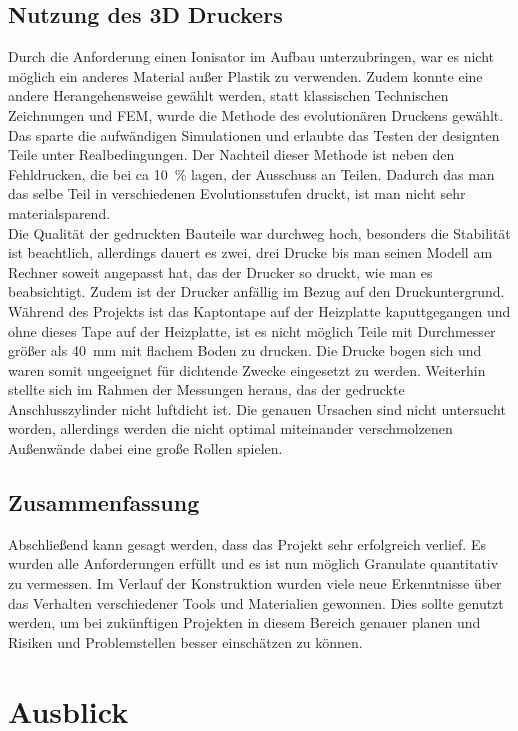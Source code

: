 \subsection{Nutzung des 3D Druckers}

Durch die Anforderung einen Ionisator im Aufbau unterzubringen, war es nicht möglich ein anderes Material außer Plastik zu verwenden. Zudem konnte eine andere Herangehensweise gewählt werden, statt klassischen Technischen Zeichnungen und FEM, wurde die Methode des evolutionären Druckens gewählt. Das sparte die aufwändigen Simulationen und erlaubte das Testen der designten Teile unter Realbedingungen. Der Nachteil dieser Methode ist neben den  Fehldrucken, die bei ca \SI{10}{\%} lagen, der Ausschuss an Teilen. Dadurch das man das selbe Teil in verschiedenen Evolutionsstufen druckt, ist man nicht sehr materialsparend. \\
Die Qualität der gedruckten Bauteile war durchweg hoch, besonders die Stabilität ist beachtlich, allerdings dauert es zwei, drei Drucke bis man seinen Modell am Rechner soweit angepasst hat, das der Drucker so druckt, wie man es beabsichtigt. Zudem ist der Drucker anfällig im Bezug auf den Druckuntergrund. Während des Projekts ist das Kaptontape auf der Heizplatte kaputtgegangen und ohne dieses Tape auf der Heizplatte, ist es nicht möglich Teile mit Durchmesser größer als \SI{40}{mm} mit flachem Boden zu drucken. Die Drucke bogen sich und waren somit ungeeignet für dichtende Zwecke eingesetzt zu werden. Weiterhin stellte sich im Rahmen der Messungen heraus, das der gedruckte Anschlusszylinder nicht luftdicht ist. Die genauen Ursachen sind nicht untersucht worden, allerdings werden die nicht optimal miteinander verschmolzenen Außenwände dabei eine große Rollen spielen.


\subsection{Zusammenfassung}

Abschließend kann gesagt werden, dass das Projekt sehr erfolgreich verlief. Es wurden alle Anforderungen erfüllt und es ist nun möglich Granulate quantitativ zu vermessen.
Im Verlauf der Konstruktion wurden viele neue Erkenntnisse über das Verhalten verschiedener Tools und Materialien gewonnen. Dies sollte genutzt werden, um bei zukünftigen Projekten in diesem Bereich genauer planen und Risiken und Problemstellen besser einschätzen zu können.




\section{Ausblick}

